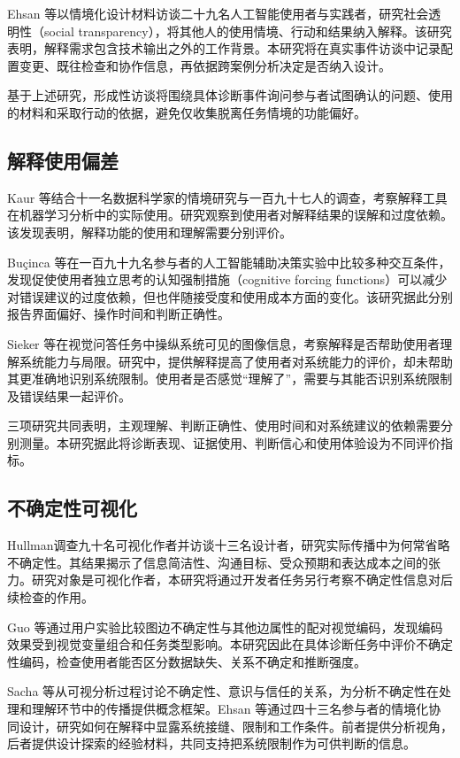 Ehsan 等\cite{ref51}以情境化设计材料访谈二十九名人工智能使用者与实践者，研究社会透明性（social transparency），将其他人的使用情境、行动和结果纳入解释。该研究表明，解释需求包含技术输出之外的工作背景。本研究将在真实事件访谈中记录配置变更、既往检查和协作信息，再依据跨案例分析决定是否纳入设计。

基于上述研究，形成性访谈将围绕具体诊断事件询问参与者试图确认的问题、使用的材料和采取行动的依据，避免仅收集脱离任务情境的功能偏好。

\subsection{解释使用偏差}

Kaur 等\cite{ref50}结合十一名数据科学家的情境研究与一百九十七人的调查，考察解释工具在机器学习分析中的实际使用。研究观察到使用者对解释结果的误解和过度依赖。该发现表明，解释功能的使用和理解需要分别评价。

Buçinca 等\cite{ref55}在一百九十九名参与者的人工智能辅助决策实验中比较多种交互条件，发现促使使用者独立思考的认知强制措施（cognitive forcing functions）可以减少对错误建议的过度依赖，但也伴随接受度和使用成本方面的变化。该研究据此分别报告界面偏好、操作时间和判断正确性。

Sieker 等\cite{ref56}在视觉问答任务中操纵系统可见的图像信息，考察解释是否帮助使用者理解系统能力与局限。研究中，提供解释提高了使用者对系统能力的评价，却未帮助其更准确地识别系统限制。使用者是否感觉“理解了”，需要与其能否识别系统限制及错误结果一起评价。

三项研究共同表明，主观理解、判断正确性、使用时间和对系统建议的依赖需要分别测量。本研究据此将诊断表现、证据使用、判断信心和使用体验设为不同评价指标。

\subsection{不确定性可视化}

Hullman\cite{ref40}调查九十名可视化作者并访谈十三名设计者，研究实际传播中为何常省略不确定性。其结果揭示了信息简洁性、沟通目标、受众预期和表达成本之间的张力。研究对象是可视化作者，本研究将通过开发者任务另行考察不确定性信息对后续检查的作用。

Guo 等\cite{ref62}通过用户实验比较图边不确定性与其他边属性的配对视觉编码，发现编码效果受到视觉变量组合和任务类型影响。本研究因此在具体诊断任务中评价不确定性编码，检查使用者能否区分数据缺失、关系不确定和推断强度。

Sacha 等\cite{ref39}从可视分析过程讨论不确定性、意识与信任的关系，为分析不确定性在处理和理解环节中的传播提供概念框架。Ehsan 等\cite{ref54}通过四十三名参与者的情境化协同设计，研究如何在解释中显露系统接缝、限制和工作条件。前者提供分析视角，后者提供设计探索的经验材料，共同支持把系统限制作为可供判断的信息。

